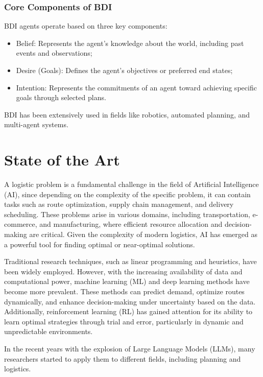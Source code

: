 \subsubsection{Core Components of BDI}
BDI agents operate based on three key components:
\begin{itemize}
  \item Belief: Represents the agent's knowledge about the world, including past
    events and observations;

  \item Desire (Goals): Defines the agent's objectives or preferred end states;

  \item Intention: Represents the commitments of an agent toward achieving
    specific goals through selected plans.
\end{itemize}

BDI has been extensively used in fields like robotics, automated planning, and multi-agent
systems.

\section{State of the Art}
\label{sec:state_of_the_art}

A logistic problem is a fundamental challenge in the field of Artificial
Intelligence (AI), since depending on the complexity of the specific problem, it
can contain tasks such as route optimization, supply chain management, and
delivery scheduling. These problems arise in various domains, including
transportation, e-commerce, and manufacturing, where efficient resource allocation
and decision-making are critical. Given the complexity of modern logistics, AI has
emerged as a powerful tool for finding optimal or near-optimal solutions.

Traditional research techniques, such as linear programming and heuristics, have
been widely employed. However, with the increasing availability of data and computational
power, machine learning (ML) and deep learning methods have become more
prevalent. These methods can predict demand, optimize routes dynamically, and enhance
decision-making under uncertainty based on the data. Additionally, reinforcement
learning (RL) has gained attention for its ability to learn optimal strategies through
trial and error, particularly in dynamic and unpredictable environments.

In the recent years with the explosion of Large Language Models (LLMs), many researchers
started to apply them to different fields, including planning and logistics.

